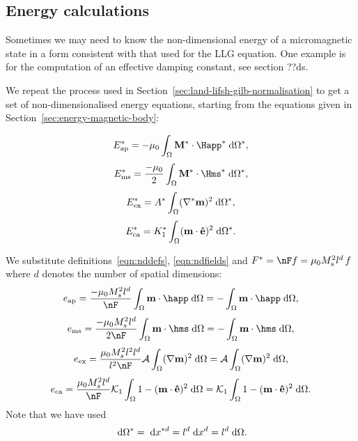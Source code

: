 \subsection{Energy calculations}
\label{sec:energy-calculations}

Sometimes we may need to know the non-dimensional energy of a micromagnetic state in a form consistent with that used for the LLG equation. One example is for the computation of an effective damping constant, see section ??ds.

We repeat the process used in Section~\ref{sec:land-lifsh-gilb-normalisation} to get a set of non-dimensionalised energy equations, starting from the equations given in Section~\ref{sec:energy-magnetic-body}:

\begin{equation*}
  E_\text{ap}^* = - \mu_0 \int_{\magd} \Mv^* \cdot \Happ^* \d \magd^*,
\end{equation*}
\begin{equation}
  E_\text{ms}^* =  \frac{-\mu_0}{2} \int_{\magd} \Mv^* \cdot \Hms^* \d \magd^*,
\end{equation}
\begin{equation*}
  E_\text{ex}^* =  A^* \int_{\Omega} (\nabla^* \mathbf{m})^2 {\; \text{d}} \Omega^*,
\end{equation*}
\begin{equation*}
  E_\text{ca}^* =  K_1^* \int_\Omega (\mathbf{m} \cdot \mathbf{\hat{e}})^2 {\; \text{d}} \Omega^*.
\end{equation*}

We substitute definitions~\eqref{eqn:nddefs}, \eqref{eqn:ndfields} and $F^* = \nF f = \mu_0 M_s^2 l^d \, f$ where $d$ denotes the number of spatial dimensions:
\begin{equation*}
  e_\text{ap} = \frac{-\mu_0 M_s^2 l^d}{\nF} \int_{\magd} \mv \cdot \happ \d \magd
  = - \int_{\magd} \mv \cdot \happ \d \magd,
\end{equation*}
\begin{equation}
  e_\text{ms} = \frac{-\mu_0 M_s^2 l^d}{2\nF} \int_{\magd} \mv \cdot \hms \d \magd
  = - \int_{\magd} \mv \cdot \hms \d \magd,
\end{equation}
\begin{equation*}
  e_\text{ex} =  \frac{\mu_0 M_s^2 l^2 l^d}{l^2\nF} \exchc \int_{\magd} (\nabla \mv)^2 \d \magd
  = \exchc \int_{\magd} (\nabla \mv)^2 \d \magd,
\end{equation*}
\begin{equation*}
  e_\text{ca} = \frac{\mu_0 M_s^2 l^d}{\nF} \kone \int_\magd 1 - (\mv \cdot \ev)^2 \d \magd
  = \kone \int_\magd 1 - (\mv \cdot \ev)^2 \d \magd.
\end{equation*}
Note that we have used
\begin{equation}
  {\; \text{d}} \Omega^* = {\; \text{d}} x^{*d} = l^d {\; \text{d}} x^d = l^d {\; \text{d}} \Omega.
\end{equation}




